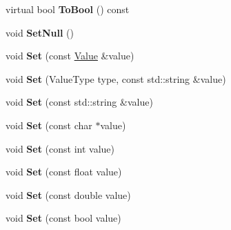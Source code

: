\begin{DoxyCompactItemize}
\item 
\hypertarget{class_jzon_1_1_value_ad56b42fc1d156dded80060674b2fed71}{virtual bool {\bfseries To\-Bool} () const }\label{class_jzon_1_1_value_ad56b42fc1d156dded80060674b2fed71}

\item 
\hypertarget{class_jzon_1_1_value_ac15339ae6c02c936537b7c543a282e21}{void {\bfseries Set\-Null} ()}\label{class_jzon_1_1_value_ac15339ae6c02c936537b7c543a282e21}

\item 
\hypertarget{class_jzon_1_1_value_afe8d653c1ba5a11e4bb3f0973df8addc}{void {\bfseries Set} (const \hyperlink{class_jzon_1_1_value}{Value} \&value)}\label{class_jzon_1_1_value_afe8d653c1ba5a11e4bb3f0973df8addc}

\item 
\hypertarget{class_jzon_1_1_value_a78f9cf22b6e2944dd9c8029df5a0caa0}{void {\bfseries Set} (Value\-Type type, const std\-::string \&value)}\label{class_jzon_1_1_value_a78f9cf22b6e2944dd9c8029df5a0caa0}

\item 
\hypertarget{class_jzon_1_1_value_ac92a676958ef33a7ec22f6c8f83b1a99}{void {\bfseries Set} (const std\-::string \&value)}\label{class_jzon_1_1_value_ac92a676958ef33a7ec22f6c8f83b1a99}

\item 
\hypertarget{class_jzon_1_1_value_aa144e4f5908b85fb0cbd58550e1fb814}{void {\bfseries Set} (const char $\ast$value)}\label{class_jzon_1_1_value_aa144e4f5908b85fb0cbd58550e1fb814}

\item 
\hypertarget{class_jzon_1_1_value_a371577c1b6829c4313287264e6effaed}{void {\bfseries Set} (const int value)}\label{class_jzon_1_1_value_a371577c1b6829c4313287264e6effaed}

\item 
\hypertarget{class_jzon_1_1_value_a1b4746098fa6f7e082c7d619e47ead6c}{void {\bfseries Set} (const float value)}\label{class_jzon_1_1_value_a1b4746098fa6f7e082c7d619e47ead6c}

\item 
\hypertarget{class_jzon_1_1_value_a900250dc37d85e531cd8be31bd282287}{void {\bfseries Set} (const double value)}\label{class_jzon_1_1_value_a900250dc37d85e531cd8be31bd282287}

\item 
\hypertarget{class_jzon_1_1_value_a39df6bbd7512e4ea7ae3497528322a70}{void {\bfseries Set} (const bool value)}\label{class_jzon_1_1_value_a39df6bbd7512e4ea7ae3497528322a70}


\end{DoxyCompactItemize}
